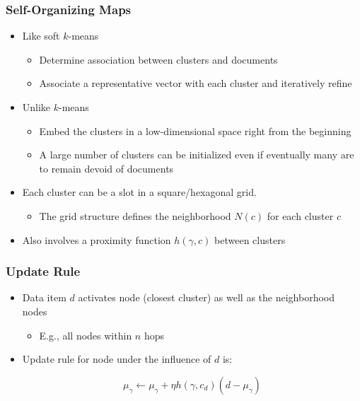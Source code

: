 \documentclass{beamer}
\begin{document}
\begin{frame}
  \frametitle{Self-Organizing Maps}

  \begin{itemize}
  \item Like soft $k$-means
    \begin{itemize}
    \item Determine association between clusters and documents
    \item Associate a representative vector with each cluster and iteratively
      refine
    \end{itemize}
  \item Unlike $k$-means
    \begin{itemize}
    \item Embed the clusters in a low-dimensional space right from the
      beginning
    \item A large number of clusters can be initialized even if eventually many
      are to remain devoid of documents
    \end{itemize}
  \item Each cluster can be a slot in a square/hexagonal grid.
    \begin{itemize}
    \item The grid structure defines the neighborhood $N(c)$ for each cluster
      $c$
    \end{itemize}
  \item Also involves a proximity function $h(\gamma,c)$ between clusters
  \end{itemize}

\end{frame}


\begin{frame}
  \frametitle{Update Rule}

  \begin{itemize}
  \item Data item $d$ activates node (closest cluster) as well as the
    neighborhood nodes
    \begin{itemize}
    \item E.g., all nodes within $n$ hops
    \end{itemize}
  \item Update rule for node under the influence of $d$ is:
    \begin{block}{}
      \begin{displaymath}
        \mu_\gamma \leftarrow \mu_\gamma + \eta h(\gamma,c_d)(d - \mu_\gamma)
      \end{displaymath}
    \end{block}
  \end{itemize}
    
\end{frame}
\end{document}
